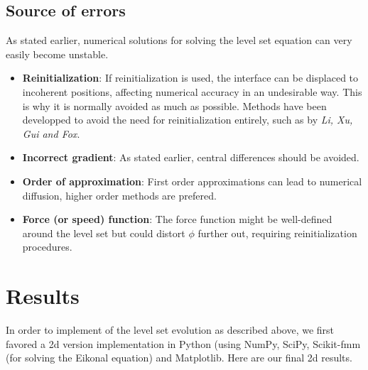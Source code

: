 \documentclass{article}
\begin{document}
\subsection{Source of errors}
As stated earlier, numerical solutions for solving the level set equation can
very easily become unstable.
\begin{itemize}
    \item \textbf{Reinitialization}: If reinitialization is used, the interface
        can be displaced to incoherent positions, affecting numerical accuracy
        in an undesirable way. This is why it is normally avoided as much as
        possible. Methods have been developped to avoid the need for
        reinitialization entirely, such as \cite{li2010distance} by \emph{Li,
        Xu, Gui and Fox}.
    \item \textbf{Incorrect gradient}: As stated earlier, central differences
        should be avoided.
    \item \textbf{Order of approximation}: First order approximations can lead
        to numerical diffusion, higher order methods are prefered.
    \item \textbf{Force (or speed) function}: The force function might be
        well-defined around the level set but could distort $\phi$
        further out, requiring reinitialization procedures. 
\end{itemize}

\section{Results}
In order to implement of the level set evolution as described above, we first
favored a 2d version implementation in Python (using NumPy, SciPy, Scikit-fmm
(for solving the Eikonal equation) and Matplotlib. Here are our final 2d
results.
\begin{figure}[H]
  \centering
  ~
   \\
  ~
   \\
   ~
\end{figure}
\end{document}
